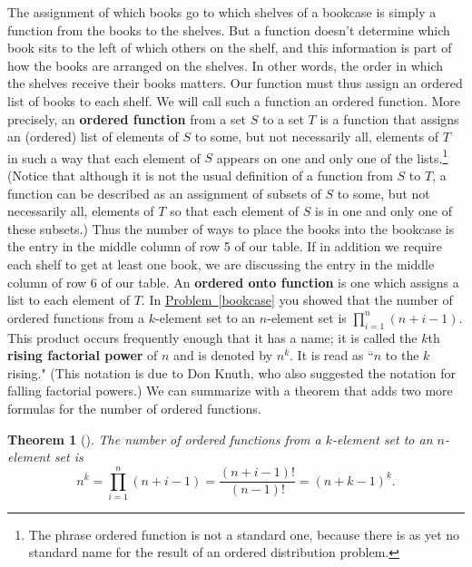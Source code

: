 \documentclass[10pt,]{book}
\newcommand{\terminology}[1]{\textbf{#1}}
\theoremstyle{plain}
\newtheorem{theorem}{Theorem}[section]
\theoremstyle{definition}
\numberwithin{equation}{chapter}
\begin{document}
The assignment of which books go to which shelves of a bookcase is simply a function from the books to the shelves. But a function doesn't determine which book sits to the left of which others on the shelf, and this information is part of how the books are arranged on the shelves. In other words, the order in which the shelves receive their books matters.  Our function must thus assign an ordered list of books to each shelf. We will call such a function an ordered function. More precisely, an \terminology{ordered function} from a set \(S\) to a set \(T\) is a function that assigns an (ordered) list of elements of \(S\) to some, but not necessarily all, elements of \(T\) in such a way that each element of \(S\) appears on one and only one of the lists.\footnote{The phrase ordered function is not a standard one, because there is as yet no standard name for the result of an ordered distribution problem.\label{fn-6}} (Notice that although it is not the usual definition of a function from \(S\) to \(T\), a function can be described as an assignment of subsets of \(S\) to some, but not necessarily all, elements of \(T\) so that each element of \(S\) is in one and only one of these subsets.) Thus the number of ways to place the books into the bookcase is the entry in the middle column of row 5 of our table. If in addition we require each shelf to get at least one book, we are discussing the entry in the middle column of row 6 of our table. An \terminology{ordered onto function} is one which assigns a list to each element of \(T\). In \hyperref[bookcase]{Problem~\ref{bookcase}} you showed that the number of ordered functions from a \(k\)-element set to an \(n\)-element set is \(\displaystyle \prod_{i=1}^n (n+i-1)\). This product occurs frequently enough that it has a name; it is called the \(k\)\/th \terminology{rising factorial power} of \(n\) and is denoted by \(n^{\overline{k}}\). It is read as ``\(n\) to the \(k\) rising." (This notation is due to Don Knuth, who also suggested the notation for falling factorial powers.) We can summarize with a theorem that adds two more formulas for the number of ordered functions.%
\begin{theorem}[{}]\label{theorem-6}
The number of ordered functions from a \(k\)-element set to an \(n\)-element set is%
\begin{equation*}
n^{\overline{k}}=\prod_{i=1}^n (n+i-1) = \frac{(n+i-1)!}{(n-1)!} =
(n+k-1)^{\underline{k}}.
\end{equation*}
%
\end{theorem}
\typeout{************************************************}
\typeout{************************************************}
\end{document}
